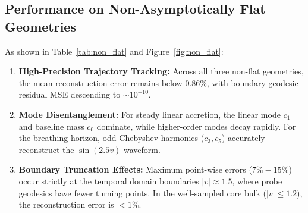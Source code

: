 \documentclass[11pt,a4paper]{article}
\begin{document}
\begin{table}[h!]
\centering
{}
\caption{\textbf{Non-Asymptotically Flat Reconstruction Benchmarks.} Quantitative metrics for unconstrained domain Chebyshev reconstructions across continuous accretion, runaway infall, and oscillatory driving.}
\label{tab:non_flat}
\end{table}

\subsection{Performance on Non-Asymptotically Flat Geometries}
As shown in Table~\ref{tab:non_flat} and Figure~\ref{fig:non_flat}:
\begin{enumerate}
    \item \textbf{High-Precision Trajectory Tracking:} Across all three non-flat geometries, the mean reconstruction error remains below \textbf{$0.86\%$}, with boundary geodesic residual MSE descending to $\sim 10^{-10}$.
    \item \textbf{Mode Disentanglement:} For steady linear accretion, the linear mode $c_1$ and baseline mass $c_0$ dominate, while higher-order modes decay rapidly. For the breathing horizon, odd Chebyshev harmonics ($c_3, c_5$) accurately reconstruct the $\sin(2.5v)$ waveform.
    \item \textbf{Boundary Truncation Effects:} Maximum point-wise errors ($7\% - 15\%$) occur strictly at the temporal domain boundaries $|v| \approx 1.5$, where probe geodesics have fewer turning points. In the well-sampled core bulk ($|v| \le 1.2$), the reconstruction error is $< 1\%$.
\end{enumerate}
\end{document}
